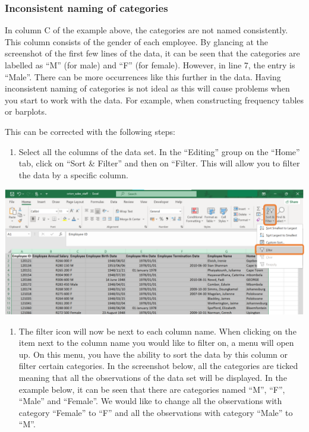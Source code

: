 \documentclass[
]{book}
\providecommand{\tightlist}{%
  \setlength{\itemsep}{0pt}\setlength{\parskip}{0pt}}
\begin{document}
\subsubsection*{Inconsistent naming of categories}\label{inconsistent-naming-of-categories}

In column C of the example above, the categories are not named consistently. This column consists of the gender of each employee. By glancing at the screenshot of the first few lines of the data, it can be seen that the categories are labelled as ``M'' (for male) and ``F'' (for female). However, in line 7, the entry is ``Male''. There can be more occurrences like this further in the data. Having inconsistent naming of categories is not ideal as this will cause problems when you start to work with the data. For example, when constructing frequency tables or barplots.

This can be corrected with the following steps:

\begin{enumerate}
\def\labelenumi{\arabic{enumi}.}
\tightlist
\item
  Select all the columns of the data set. In the ``Editing'' group on the ``Home'' tab, click on ``Sort \& Filter'' and then on ``Filter. This will allow you to filter the data by a specific column.
\end{enumerate}

\begin{center}\includegraphics[width=0.7\linewidth]{Figures/cleaning_categories_1} \end{center}

\begin{enumerate}
\def\labelenumi{\arabic{enumi}.}
\setcounter{enumi}{1}
\tightlist
\item
  The filter icon will now be next to each column name. When clicking on the item next to the column name you would like to filter on, a menu will open up. On this menu, you have the ability to sort the data by this column or filter certain categories. In the screenshot below, all the categories are ticked meaning that all the observations of the data set will be displayed. In the example below, it can be seen that there are categories named ``M'', ``F'', ``Male'' and ``Female''. We would like to change all the observations with category ``Female'' to ``F'' and all the observations with category ``Male'' to ``M''.
\end{enumerate}
\end{document}
